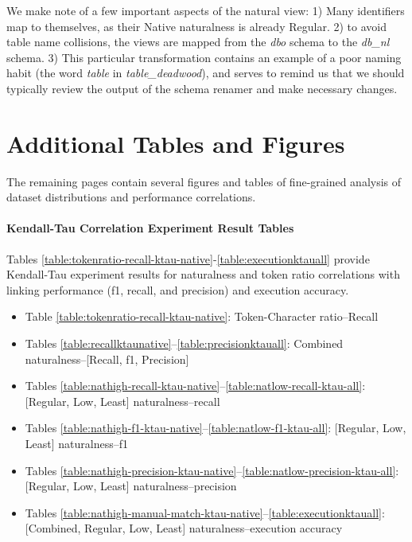 We make note of a few important aspects of the natural view: 1) Many identifiers map to themselves, as their Native naturalness is already Regular. 2) to avoid table name collisions, the views are mapped from the \emph{dbo} schema to the \emph{db\_nl} schema. 3) This particular transformation contains an example of a poor naming habit (the word \emph{table} in \emph{table\_deadwood}), and serves to remind us that we should typically review the output of the schema renamer and make necessary changes.


\section{Additional Tables and Figures}


The remaining pages contain several figures and tables of fine-grained analysis of dataset distributions and performance correlations.

\paragraph{Kendall-Tau Correlation Experiment Result Tables}

Tables \ref{table:tokenratio-recall-ktau-native}-\ref{table:executionktauall} provide Kendall-Tau experiment results for naturalness and token ratio correlations with linking performance (f1, recall, and precision) and execution accuracy.

\begin{itemize}
  \item Table \ref{table:tokenratio-recall-ktau-native}: Token-Character ratio--Recall
  \item Tables \ref{table:recallktaunative}--\ref{table:precisionktauall}: Combined naturalness--[Recall, f1, Precision]
  \item Tables \ref{table:nathigh-recall-ktau-native}--\ref{table:natlow-recall-ktau-all}: [Regular, Low, Least] naturalness--recall
  \item Tables \ref{table:nathigh-f1-ktau-native}--\ref{table:natlow-f1-ktau-all}: [Regular, Low, Least] naturalness--f1
  \item Tables \ref{table:nathigh-precision-ktau-native}--\ref{table:natlow-precision-ktau-all}: [Regular, Low, Least] naturalness--precision
  \item Tables \ref{table:nathigh-manual-match-ktau-native}--\ref{table:executionktauall}: [Combined, Regular, Low, Least] naturalness--execution accuracy
\end{itemize}

